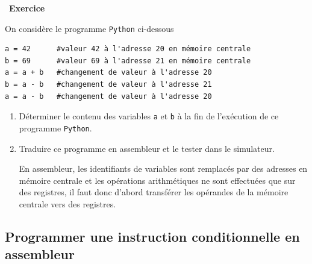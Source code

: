\documentclass[a4paper, french, 11pt]{article}  %
\newcounter{exercice}
\newenvironment{exercice}[1]
{\par \medskip   \addtocounter{exercice}{1} \noindent  
\begin{bclogo}[arrondi =0.1,   noborder = true, logo=\bccrayon, marge=4]{~\textbf{Exercice} \textbf{\theexercice} {\itshape #1} }  \par}
{
\end{bclogo}
 \par \bigskip }
\newcounter{prog}
\begin{document}
\begin{exercice}{}


On considère le programme \texttt{Python} ci-dessous
\begin{lstlisting}[style=rond]
a = 42      #valeur 42 à l'adresse 20 en mémoire centrale
b = 69      #valeur 69 à l'adresse 21 en mémoire centrale
a = a + b   #changement de valeur à l'adresse 20
b = a - b   #changement de valeur à l'adresse 21
a = a - b   #changement de valeur à l'adresse 20
\end{lstlisting}

\begin{enumerate}
	\item Déterminer le contenu des variables \texttt{a} et \texttt{b} à la fin de l'exécution de ce programme \texttt{Python}.
	\item Traduire ce programme en assembleur et le tester dans le simulateur.

\bcattention{} En assembleur, les identifiants de variables sont remplacés par des adresses en mémoire centrale et les opérations arithmétiques ne sont effectuées que sur des registres, il faut donc d'abord transférer les opérandes de la mémoire centrale vers des registres.

\end{enumerate}


\end{exercice}


\subsection{Programmer une instruction conditionnelle en assembleur}
\end{document}
